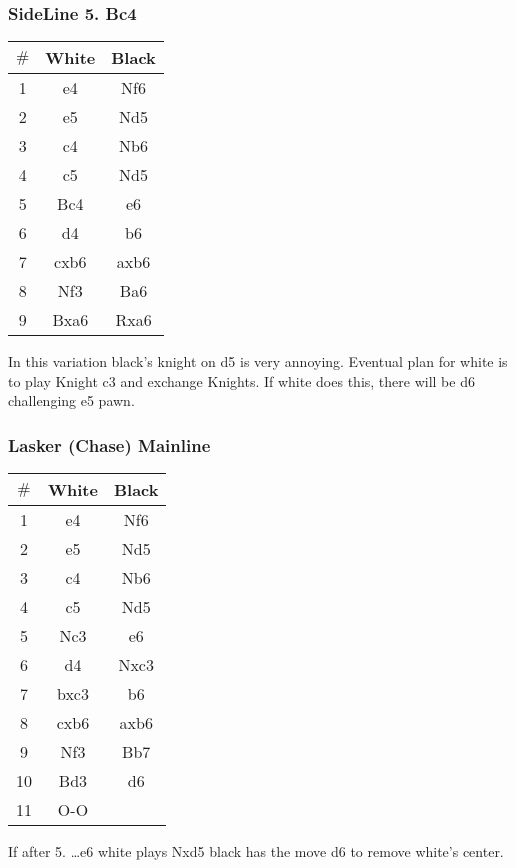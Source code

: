 \documentclass{article}
\newcommand{\smalls}{\par\smallskip}
\begin{document}
        \subsubsection*{SideLine 5. Bc4}
        \begin{multicols}{2}
            \showboard
            \smalls
            \begin{tabular}{c|c|c}
                $\#$ & White & Black\\
                \hline
                1 & e4 & Nf6 \\
                2 & e5 & Nd5 \\
                3 & c4 & Nb6 \\
                4 & c5 & Nd5 \\
                5 & Bc4 & e6 \\
                6 & d4 & b6 \\
                7 & cxb6 & axb6 \\
                8 & Nf3 & Ba6 \\
                9 & Bxa6 & Rxa6 \\
            \end{tabular}
        \end{multicols}
        In this variation black's knight on d5 is very annoying.  Eventual plan
        for white is to play Knight c3 and exchange Knights.  If white does
        this, there will be d6 challenging e5 pawn.

        \subsubsection*{Lasker (Chase)  Mainline}
        \begin{multicols}{2}
            \showboard
            \smalls
            \begin{tabular}{c|c|c}
                $\#$ & White & Black\\
                \hline
                1 & e4 & Nf6 \\
                2 & e5 & Nd5 \\
                3 & c4 & Nb6 \\
                4 & c5 & Nd5 \\
                5 & Nc3 & e6 \\
                6 & d4 & Nxc3 \\
                7 & bxc3 & b6 \\
                8 & cxb6 & axb6 \\
                9 & Nf3 & Bb7 \\
                10 &  Bd3 & d6 \\
                11 & O-O & \\
            \end{tabular}
        \end{multicols}
        If after 5. \dots e6 white plays Nxd5 black has the move d6 to remove
        white's center.
\end{document}
